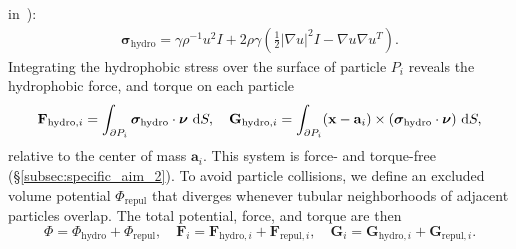 in~\cite{Fu2018_SIAM}):
\begin{align}
  \label{stress}
\boldsymbol{\sigma}_{\text{hydro}} = \gamma \rho^{-1} u^2 I + 2\rho
  \gamma \left(\frac{1}{2}|\nabla u|^2I - \nabla u \nabla u^T\right).
\end{align}
%
%
Integrating the hydrophobic stress over the surface of particle $P_i$
reveals the hydrophobic force, and torque on each particle 
\begin{align}
  \label{forceandtorque}
  \mathbf{F}_{\text{hydro},i} = \int_{\partial P_i} \boldsymbol{\sigma}_{\text{hydro}}
  \cdot \boldsymbol{\nu} \,\dif S,\quad
  \mathbf{G}_{\text{hydro},i} = \int_{\partial P_i} (\mathbf{x}-\mathbf{a}_i) \times
  (\boldsymbol{\sigma}_{\text{hydro}} \cdot \boldsymbol{\nu}) \,\dif S,
\end{align}
relative to the center of mass $\mathbf{a}_i$. This system is force- and
torque-free (\S\ref{subsec:specific_aim_2}). To avoid particle
collisions, we define an excluded volume potential $\Phi_{\text{repul}}$
that diverges whenever tubular neighborhoods of adjacent particles
overlap. The total potential, force, and torque are then
\begin{equation}
\label{eq:total_poten}
\Phi = \Phi_{\text{hydro}} + \Phi_{\text{repul}},\quad
\mathbf{F}_{i} = \mathbf{F}_{\text{hydro},i} + \mathbf{F}_{\text{repul},i},\quad
\mathbf{G}_{i} = \mathbf{G}_{\text{hydro},i} + \mathbf{G}_{\text{repul},i}.
\end{equation}


